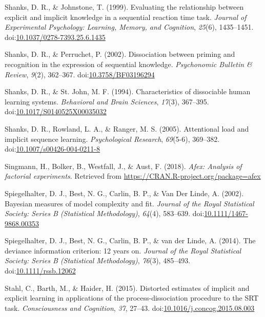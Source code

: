 \documentclass[floatsintext,doc]{apa6}
\theoremstyle{definition}
\theoremstyle{definition}
\theoremstyle{definition}
\theoremstyle{remark}
\begin{document}
\hypertarget{ref-shanks_evaluating_1999}{}
Shanks, D. R., \& Johnstone, T. (1999). Evaluating the relationship
between explicit and implicit knowledge in a sequential reaction time
task. \emph{Journal of Experimental Psychology: Learning, Memory, and
Cognition}, \emph{25}(6), 1435--1451.
doi:\href{https://doi.org/10.1037/0278-7393.25.6.1435}{10.1037/0278-7393.25.6.1435}

\hypertarget{ref-shanks_dissociation_2002}{}
Shanks, D. R., \& Perruchet, P. (2002). Dissociation between priming and
recognition in the expression of sequential knowledge. \emph{Psychonomic
Bulletin \& Review}, \emph{9}(2), 362--367.
doi:\href{https://doi.org/10.3758/BF03196294}{10.3758/BF03196294}

\hypertarget{ref-shanks_characteristics_1994}{}
Shanks, D. R., \& St. John, M. F. (1994). Characteristics of dissociable
human learning systems. \emph{Behavioral and Brain Sciences},
\emph{17}(3), 367--395.
doi:\href{https://doi.org/10.1017/S0140525X00035032}{10.1017/S0140525X00035032}

\hypertarget{ref-shanks_attentional_2005}{}
Shanks, D. R., Rowland, L. A., \& Ranger, M. S. (2005). Attentional load
and implicit sequence learning. \emph{Psychological Research},
\emph{69}(5-6), 369--382.
doi:\href{https://doi.org/10.1007/s00426-004-0211-8}{10.1007/s00426-004-0211-8}

\hypertarget{ref-R-afex}{}
Singmann, H., Bolker, B., Westfall, J., \& Aust, F. (2018). \emph{Afex:
Analysis of factorial experiments}. Retrieved from
\url{https://CRAN.R-project.org/package=afex}

\hypertarget{ref-spiegelhalter_bayesian_2002}{}
Spiegelhalter, D. J., Best, N. G., Carlin, B. P., \& Van Der Linde, A.
(2002). Bayesian measures of model complexity and fit. \emph{Journal of
the Royal Statistical Society: Series B (Statistical Methodology)},
\emph{64}(4), 583--639.
doi:\href{https://doi.org/10.1111/1467-9868.00353}{10.1111/1467-9868.00353}

\hypertarget{ref-spiegelhalter_deviance_2014}{}
Spiegelhalter, D. J., Best, N. G., Carlin, B. P., \& van der Linde, A.
(2014). The deviance information criterion: 12 years on. \emph{Journal
of the Royal Statistical Society: Series B (Statistical Methodology)},
\emph{76}(3), 485--493.
doi:\href{https://doi.org/10.1111/rssb.12062}{10.1111/rssb.12062}

\hypertarget{ref-stahl_distorted_2015}{}
Stahl, C., Barth, M., \& Haider, H. (2015). Distorted estimates of
implicit and explicit learning in applications of the
process-dissociation procedure to the SRT task. \emph{Consciousness and
Cognition}, \emph{37}, 27--43.
doi:\href{https://doi.org/10.1016/j.concog.2015.08.003}{10.1016/j.concog.2015.08.003}
\end{document}

